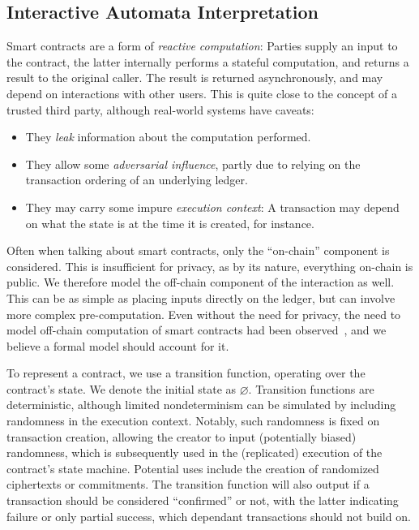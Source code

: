\subsection{Interactive Automata Interpretation}

Smart contracts are a form of \emph{reactive computation}: Parties supply an input
to the contract, the latter internally performs a stateful computation, and returns a
result to the original caller. The result is returned asynchronously, and may
depend on interactions with other users. This is quite close to the concept of a
trusted third party, although real-world systems have caveats:
\begin{itemize}
  \item They \emph{leak} information about the computation performed.
  \item They allow some \emph{adversarial influence}, partly due to relying on the
    transaction ordering of an underlying ledger.
  \item They may carry some impure \emph{execution context}: A transaction may
    depend on what the state is at the time it is created, for instance.
\end{itemize}

Often when talking about smart contracts, only the ``on-chain'' component
is considered. This is insufficient for privacy, as by its nature, everything
on-chain is public. We therefore model the off-chain component of the
interaction as well. This can be as simple as placing inputs directly on the
ledger, but can involve more complex pre-computation. Even without the need for
privacy, the need to model off-chain computation of smart contracts had been
observed~\cite{CKMM+19}, and we believe a formal model should account for it.

To represent a contract, we use a transition function, operating over the
contract's state. We denote the initial state as $\varnothing$. Transition
functions are deterministic, although limited nondeterminism can be simulated by
including randomness in the execution context. Notably, such randomness is
  fixed on transaction creation, allowing the creator to input (potentially
  biased) randomness, which is subsequently used in the (replicated) execution
  of the contract's state machine. Potential uses include the creation of
  randomized ciphertexts or commitments. The transition function will also
  output if a transaction should be considered ``confirmed'' or not, with the
  latter indicating failure or only partial success, which dependant
  transactions should not build on.

